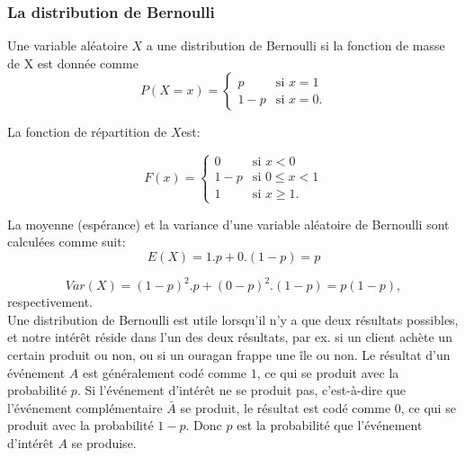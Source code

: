 {\subsubsection{La distribution de Bernoulli}

\theoremstyle{definition}
\begin{definition}
    Une variable aléatoire $ X $ a une distribution de Bernoulli si la fonction de masse de X est donnée comme
    $$P(X=x) = \begin{cases} p & \mbox{si   } x=1\\ 1-p & \mbox{si } x=0.\end{cases}$$
\end{definition}
La fonction de répartition de $X$est:

$$F(x) = \begin{cases} 0 & \mbox{si   } x<0\\ 1-p & \mbox{si } 0\leq x<1\\1 & \mbox{si   } x\geq 1.\end{cases}$$

La moyenne (espérance) et la variance d'une variable aléatoire de Bernoulli sont calculées comme suit:
\begin{equation}\label{eq:esp}
    E(X)=1.p+0.(1-p)=p
\end{equation}

\begin{equation}\label{eq:var}
    Var(X)=(1-p)^2.p+(0-p)^2.(1-p)=p(1-p),
\end{equation}
respectivement.\\

Une distribution de Bernoulli est utile lorsqu'il n'y a que deux résultats possibles, et notre intérêt réside dans
l'un des deux résultats, par ex. si un client achète un certain produit ou non, ou si un ouragan frappe une île ou
non. Le résultat d'un événement $ A $ est généralement codé comme $ 1 $, ce qui se produit avec la probabilité $ p $.
Si l'événement d'intérêt ne se produit pas, c'est-à-dire que l'événement complémentaire $\bar{A}$ se produit, le
résultat est codé comme $ 0 $, ce qui se produit avec la probabilité $ 1 - p $. Donc $ p $ est la probabilité que
l'événement d'intérêt $ A $ se produise.

}
